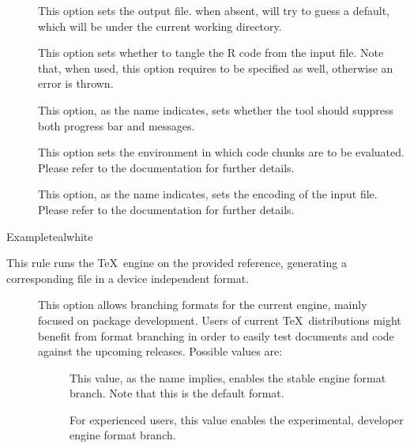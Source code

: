 \begin{description}
\begin{description}
\item[] This option sets the output file. when absent,  will try to guess a default, which will be under the current working directory.

\item[] This option sets whether to tangle the R code from the input file. Note that, when used, this option requires  to be specified as well, otherwise an error is thrown.

\item[] This option, as the name indicates, sets whether the tool should suppress both progress bar and messages.

\item[] This option sets the environment in which code chunks are to be evaluated. Please refer to the documentation for further details.

\item[] This option, as the name indicates, sets the encoding of the input file. Please refer to the documentation for further details.
\end{description}

\begin{codebox}{Example}{teal}{\icnote}{white}
\end{codebox}

\item[\rulebox{latex}]
This rule runs the  \TeX\ engine on the provided  reference, generating a corresponding file in a device independent format.

\begin{description}
\item[] This option allows branching formats for the current engine, mainly focused on package development. Users of current \TeX\ distributions might benefit from format branching in order to easily test documents and code against the upcoming releases. Possible values are:

\begin{description}
\item[] This value, as the name implies, enables the stable engine format branch. Note that this is the default format.

\item[] For experienced users, this value enables the experimental, developer engine format branch.
\end{description}


\end{description}
\end{description}
